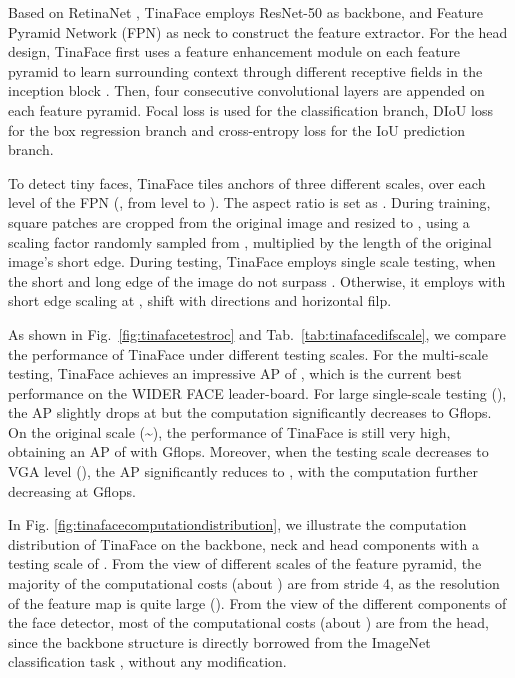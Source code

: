 \documentclass[10pt,twocolumn,letterpaper]{article}
\begin{document}
Based on RetinaNet \cite{lin2017feature}, TinaFace \cite{zhu2020tinaface} employs ResNet-50 \cite{he2016deep} as backbone, and Feature Pyramid Network (FPN) \cite{lin2017feature} as neck to construct the feature extractor. For the head design, TinaFace first uses a feature enhancement module on each feature pyramid to learn surrounding context through different receptive fields in the inception block \cite{szegedy2015going}. 
Then, four consecutive  convolutional layers are appended on each feature pyramid. Focal loss \cite{lin2017focal} is used for the classification branch, DIoU loss \cite{zheng2020distance} for the box regression branch and cross-entropy loss for the IoU prediction branch.

To detect tiny faces, TinaFace tiles anchors of three different scales, over each level of the FPN (\ie , from level  to ). The aspect ratio is set as . During training, square patches are cropped from the original image and resized to , using a scaling factor randomly sampled from , multiplied by the length of the original image's short edge. During testing, TinaFace employs single scale testing,
when the short and long edge of the image do not surpass . Otherwise, it employs with short edge scaling at , shift with directions  and horizontal filp.

As shown in Fig.~\ref{fig:tinafacetestroc} and Tab.~\ref{tab:tinafacedifscale}, we compare the performance of TinaFace under different testing scales. For the multi-scale testing, TinaFace achieves an impressive AP of , which is the current best performance on the WIDER FACE leader-board. For large single-scale testing (), the AP slightly drops at  but the computation significantly decreases to  Gflops. On the original scale (\textasciitilde), the performance of TinaFace is still very high, obtaining an AP of  with  Gflops. Moreover, when the testing scale decreases to VGA level (), the AP significantly reduces to , with the computation further decreasing at  Gflops.

In Fig. \ref{fig:tinafacecomputationdistribution}, we illustrate the computation distribution of TinaFace on the backbone, neck and head components with a testing scale of . From the view of different scales of the feature pyramid, the majority of the computational costs (about ) are from stride 4, as the resolution of the feature map is quite large (). From the view of the different components of the face detector, most of the computational costs (about ) are from the head, since the backbone structure is directly borrowed from the ImageNet classification task \cite{deng2009imagenet}, without any modification.
\end{document}
